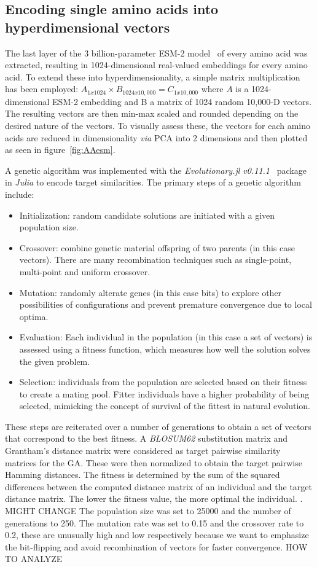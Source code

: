 \subsection*{Encoding single amino acids into hyperdimensional vectors}
The last layer of the 3 billion-parameter ESM-2 model~\cite{esm2} of every amino acid was extracted, resulting in 1024-dimensional real-valued embeddings for every amino acid. To extend these into hyperdimensionality, a simple matrix multiplication has been employed: $A_{1x1024} \times B_{1024x10,000} = C_{1x10,000}$ where $A$ is a 1024-dimensional ESM-2 embedding and B a matrix of 1024 random 10,000-D vectors. The resulting vectors are then min-max scaled and rounded depending on the desired nature of the vectors. To visually assess these, the vectors for each amino acids are reduced in dimensionality \textit{via} PCA into 2 dimensions and then plotted as seen in figure~\ref{fig:AAesm}.

A genetic algorithm was implemented with the \textit{Evolutionary.jl v0.11.1}~\cite{evojl} package in \textit{Julia} to encode target similarities. The primary steps of a genetic algorithm include:
\begin{itemize}
    \item Initialization: random candidate solutions are initiated with a given population size.
    \item Crossover: combine genetic material offspring of two parents (in this case vectors). There are many recombination techniques such as single-point, multi-point and uniform crossover.
    \item Mutation: randomly alterate genes (in this case bits) to explore other possibilities of configurations and prevent premature convergence due to local optima.
    \item Evaluation: Each individual in the population (in this case a set of vectors) is assessed using a fitness function, which measures how well the solution solves the given problem.
    \item Selection: individuals from the population are selected based on their fitness to create a mating pool. Fitter individuals have a higher probability of being selected, mimicking the concept of survival of the fittest in natural evolution.
\end{itemize}
These steps are reiterated over a number of generations to obtain a set of vectors that correspond to the best fitness. A \textit{BLOSUM62} substitution matrix \cite{blosum} and Grantham's distance matrix \cite{aa_evolution} were considered as target pairwise similarity matrices for the GA. These were then normalized to obtain the target pairwise Hamming distances. The fitness is determined by the sum of the squared differences between the computed distance matrix of an individual and the target distance matrix. The lower the fitness value, the more optimal the individual. . MIGHT CHANGE The population size was set to 25000 and the number of generations to 250. The mutation rate was set to 0.15 and the crossover rate to 0.2, these are unusually high and low respectively because we want to emphasize the bit-flipping and avoid recombination of vectors for faster convergence. HOW TO ANALYZE

